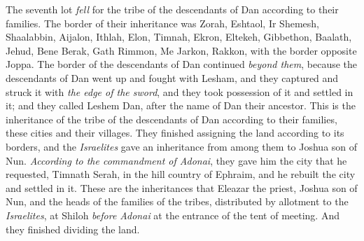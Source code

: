 \begin{biblechapter}
 The seventh lot \textit{fell} for the tribe of the descendants of Dan according to their families.
\verse The border of their inheritance was Zorah, Eshtaol, Ir Shemesh,
\verse Shaalabbin, Aijalon, Ithlah,
\verse Elon, Timnah, Ekron,
\verse Eltekeh, Gibbethon, Baalath,
\verse Jehud, Bene Berak, Gath Rimmon,
\verse Me Jarkon, Rakkon, with the border opposite Joppa.
\verse The border of the descendants of Dan continued \textit{beyond them}, because the descendants of Dan went up and fought with Lesham, and they captured and struck it with \textit{the edge of the sword}, and they took possession of it and settled in it; and they called Leshem Dan, after the name of Dan their ancestor.
\verse This is the inheritance of the tribe of the descendants of Dan according to their families, these cities and their villages.
 They finished assigning the land according to its borders, and the \textit{Israelites} gave an inheritance from among them to Joshua son of Nun.
\verse \textit{According to the commandment of Adonai}, they gave him the city that he requested, Timnath Serah, in the hill country of Ephraim, and he rebuilt the city and settled in it.
\verse These are the inheritances that Eleazar the priest, Joshua son of Nun, and the heads of the families of the tribes, distributed by allotment to the \textit{Israelites}, at Shiloh \textit{before Adonai} at the entrance of the tent of meeting. And they finished dividing the land.
\end{biblechapter}

